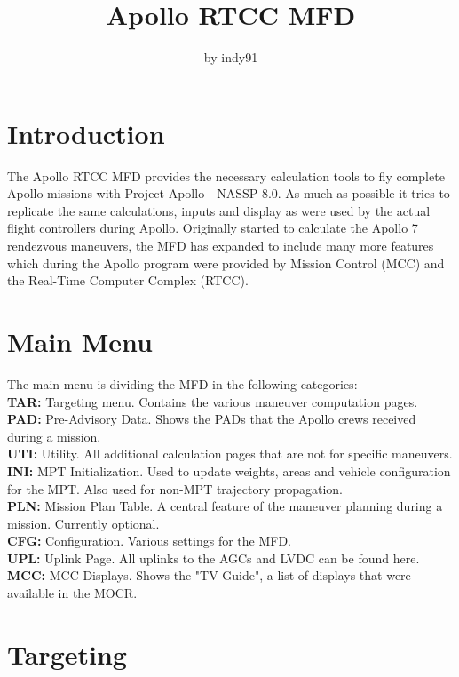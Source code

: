 \documentclass[11pt]{article} %
\title{Apollo RTCC MFD}
\author{by indy91}
\begin{document}
\maketitle

\section{Introduction}

The Apollo RTCC MFD provides the necessary calculation tools to fly complete Apollo missions with Project Apollo - NASSP 8.0. As much as possible it tries to replicate the same calculations, inputs and display as were used by the actual flight controllers during Apollo. Originally started to calculate the Apollo 7 rendezvous maneuvers, the MFD has expanded to include many more features which during the Apollo program were provided by Mission Control (MCC) and the Real-Time Computer Complex (RTCC).\\

\newpage
\tableofcontents
\newpage

\section{Main Menu}

The main menu is dividing the MFD in the following categories:\\
\textbf{TAR:} Targeting menu. Contains the various maneuver computation pages. \\
\textbf{PAD:} Pre-Advisory Data. Shows the PADs that the Apollo crews received during a mission.\\
\textbf{UTI:} Utility. All additional calculation pages that are not for specific maneuvers.\\
\textbf{INI:} MPT Initialization. Used to update weights, areas and vehicle configuration for the MPT. Also used for non-MPT trajectory propagation.\\ 
\textbf{PLN:} Mission Plan Table. A central feature of the maneuver planning during a mission. Currently optional.\\
\textbf{CFG:} Configuration. Various settings for the MFD.\\
\textbf{UPL:} Uplink Page. All uplinks to the AGCs and LVDC can be found here.\\
\textbf{MCC:} MCC Displays. Shows the "TV Guide", a list of displays that were available in the MOCR.\\

\section{Targeting}
\end{document}
